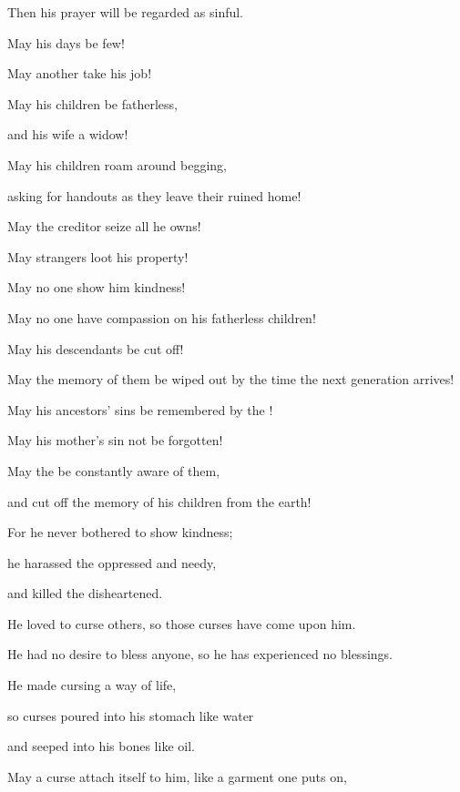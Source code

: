{\par }{\Q Then his prayer
will be regarded as sinful.
\par }{\Q {}May
his days
be few!

\par }{\Q May another
take
his job!
\par }{\Q {}May
his children
be fatherless,
\par }{\Q and his wife
a widow!
\par }{\Q {}May
his children
roam
around begging,
\par }{\Q asking
for handouts
as they leave their ruined home!
\par }{\Q {}May
the creditor
seize all
he owns!
\par }{\Q May
strangers
loot
his property!
\par }{\Q {}May no
one show him kindness!

\par }{\Q May no
one have compassion
on his fatherless children!
\par }{\Q {}May
his descendants be
cut off!

\par }{\Q May the memory
of them be wiped out
by the time the next generation
arrives!
\par }{\Q {}May his ancestors’
sins
be remembered
by the
{}!
\par }{\Q May his mother’s
sin
not
be forgotten!
\par }{\Q {}May the
{}
be
constantly
aware
of them,

\par }{\Q and cut off
the memory
of his children from the earth!
\par }{\Q {}For
he never
bothered
to show
kindness;
\par }{\Q he harassed
the oppressed
and needy,
\par }{\Q and killed
the disheartened.
\par }{\Q {}He loved
to curse others, so those
curses
have come
upon him.

\par }{\Q He had
no
desire
to bless anyone, so he has experienced
no blessings.
\par }{\Q {}He made
cursing
a way of life,
\par }{\Q so curses poured
into his stomach like water
\par }{\Q and seeped
into his bones
like oil.
\par }{\Q {}May
a curse attach itself to him, like a garment
one puts
on,

}
